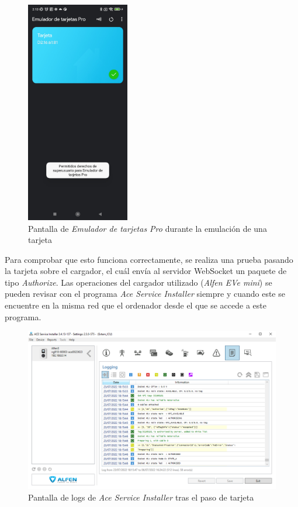 \documentclass[12pt,a4paper,onecolumn,oneside]{report}
\begin{document}
\begin{figure}[H] 
\centering
  \includegraphics[width=0.4\textwidth]{figuras/root8.png}
  \caption[Pantalla de \textit{Emulador de tarjetas Pro} durante la emulación de una tarjeta]{Pantalla de \textit{Emulador de tarjetas Pro} durante la emulación de una tarjeta\\
  }
  \label{fig:root8}
\end{figure}

Para comprobar que esto funciona correctamente, se realiza una prueba pasando la tarjeta sobre el cargador, el cuál envía al servidor WebSocket un paquete de tipo \textit{Authorize}. Las operaciones del cargador utilizado (\textit{Alfen EVe mini}) se pueden revisar con el programa \textit{Ace Service Installer} siempre y cuando este se encuentre en la misma red que el ordenador desde el que se accede a este programa.


\begin{figure}[H] 
\centering
  \includegraphics[width=1\textwidth]{figuras/authorize1.png}
  \caption[Pantalla de logs de \textit{Ace Service Installer} tras el paso de tarjeta]{Pantalla de logs de \textit{Ace Service Installer} tras el paso de tarjeta\\
  }
  \label{fig:authorize1}
\end{figure}
\end{document}
